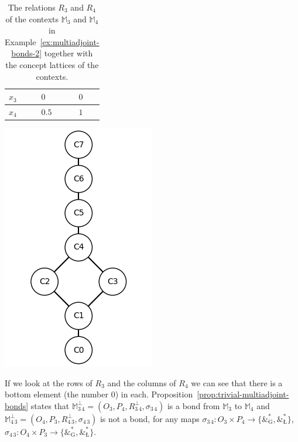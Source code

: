 \documentclass[runningheads,a4paper]{llncs}
\newcommand{\M}{\mathbb{M}}
\newcommand{\adjoint}{\mathop{\&}\nolimits}
\newcommand{\G}{\text{G}}
\let\oldLcommand\L
\let\L\relax
\def\L{\text{\oldLcommand}}
\begin{document}
\begin{example}
\begin{table}[h]
\begin{minipage}{0.25\textwidth}
\begin{tabular}{w{c}{20pt} || w{c}{20pt} | w{c}{20pt}}
		$x_3$ & $0$ & $0$ \\\hline
		$x_4$ & $0.5$ & $1$
	\end{tabular}
	\end{minipage}
	\begin{minipage}{0.2\textwidth}
		\includegraphics[scale = 0.3]{im/ex-ma2-R4.png}
	\end{minipage}
	\caption{The relations $R_3$ and $R_4$ of the contexts $\M_3$ and $\M_4$ in Example~\ref{ex:multiadjoint-bonds-2} together with the concept lattices of the contexts.}
	\label{tab:example2-multiadjoint-bonds-R3-R4}
	\vspace{-0.5cm}
\end{table}

If we look at the rows of $R_3$ and the columns of $R_4$ we can see that there is a bottom element (the number $0$) in each. Proposition~\ref{prop:trivial-multiadjoint-bonds} states that $\M_{3\,4}^\bot = (O_3, P_4, R_{3\,4}^\bot, \sigma_{3\,4})$ is a bond from $\M_3$ to $\M_4$ and $\M_{4\,3}^\bot = (O_4, P_3, R_{4\,3}^\bot, \sigma_{4\,3})$ is not a bond, for any maps $\sigma_{3\,4} \colon O_3 \times P_4 \to \{\adjoint^*_\G, \adjoint^*_\L\}$, $\sigma_{4\,3} \colon O_4 \times P_3 \to \{\adjoint^*_\G, \adjoint^*_\L\}$.


\end{example}
\end{document}
